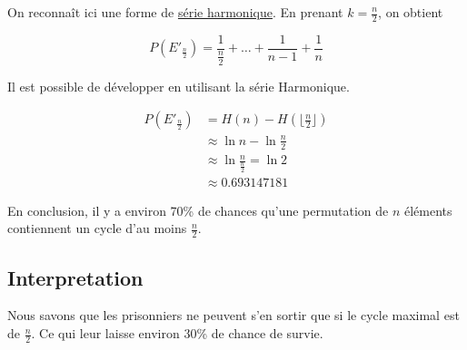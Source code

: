 	On reconnaît ici une forme de \href{https://en.wikipedia.org/wiki/Harmonic_series_(mathematics)#}{série harmonique}.
	En prenant $k = \frac{n}{2}$, on obtient

	\begin{equation}
		P(E'_{\frac{n}{2}}) = \frac{1}{\frac{n}{2}} + \hdots + \frac{1}{n - 1} + \frac{1}{n}
	\end{equation}

	Il est possible de développer en utilisant la série Harmonique.

	\begin{align*}
		P(E'_{\frac{n}{2}}) & = H(n) - H(\lfloor \frac{n}{2} \rfloor)     \\
		                    & \approx \ln{n} - \ln{\frac{n}{2}}           \\
		                    & \approx \ln{\frac{n}{\frac{n}{2}}} = \ln{2} \\
		                    & \approx 0.693147181
	\end{align*}

	En conclusion, il y a environ 70\% de chances qu'une permutation de $n$ éléments contiennent un cycle d'au moins $\frac{n}{2}$.

\subsection{Interpretation}

	Nous savons que les prisonniers ne peuvent s'en sortir que si le cycle maximal est de $\frac{n}{2}$.
	Ce qui leur laisse environ 30\% de chance de survie.

